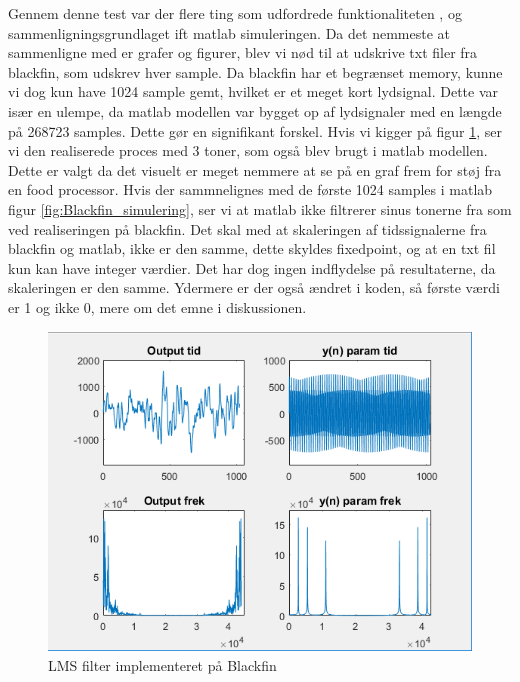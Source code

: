 Gennem denne test var der flere ting som udfordrede funktionaliteten , og sammenligningsgrundlaget ift matlab simuleringen. 
Da det nemmeste at sammenligne med er grafer og figurer, blev vi nød til at udskrive txt filer fra blackfin, som udskrev hver sample. Da blackfin har et begrænset memory, kunne vi dog kun have 1024 sample gemt, hvilket er et meget kort lydsignal. Dette var især en ulempe, da matlab modellen var bygget op af lydsignaler med en længde på 268723 samples. Dette gør en signifikant forskel. 
Hvis vi kigger på figur \ref{fig:Blackfin}, ser vi den realiserede proces med 3 toner, som også blev brugt i matlab modellen. Dette er valgt da det visuelt er meget nemmere at se på en graf frem for støj fra en food processor.
Hvis der sammnelignes med de første 1024 samples i matlab figur \ref{fig:Blackfin_simulering}, ser vi at matlab ikke filtrerer sinus tonerne fra som ved realiseringen på blackfin. Det skal med at skaleringen af tidssignalerne fra blackfin og matlab, ikke er den samme, dette skyldes fixedpoint, og at en txt fil kun kan have integer værdier. Det har dog ingen indflydelse på resultaterne, da skaleringen er den samme. Ydermere er der også ændret i koden, så første værdi er 1 og ikke 0, mere om det emne i diskussionen. 
\begin{figure}[H]
	\centering
	\includegraphics[width = 400pt]{Img/Blackfin}
	\caption{LMS filter implementeret på Blackfin}
	\label{fig:Blackfin}
\end{figure}


